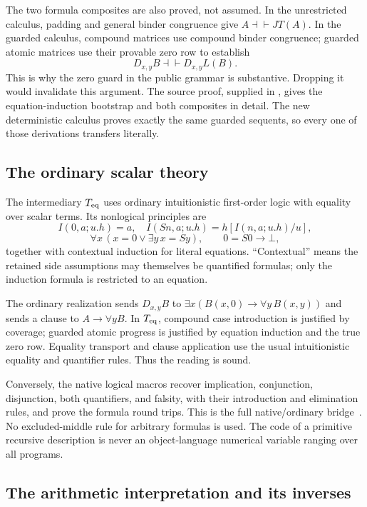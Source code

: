\documentclass[11pt,letterpaper]{article}
\theoremstyle{definition}\newtheorem{definition}[theorem]{Definition}
\theoremstyle{remark}\newtheorem{remark}[theorem]{Remark}
\begin{document}
The two formula composites are also proved, not assumed. In the unrestricted
calculus, padding and general binder congruence give $A\dashv\vdash JT(A)$.
In the guarded calculus, compound matrices use compound binder congruence;
guarded atomic matrices use their provable zero row to establish
\[
 D_{x,y}B\dashv\vdash D_{x,y}L(B).
\]
This is why the zero guard in the public grammar is substantive. Dropping it
would invalidate this argument. The source proof, supplied in
, gives the equation-induction bootstrap and
both composites in detail. The new deterministic calculus proves exactly the
same guarded sequents, so every one of those derivations transfers literally.

\subsection{The ordinary scalar theory}

The intermediary $T_{\rm eq}$ uses ordinary intuitionistic first-order logic
with equality over scalar terms. Its nonlogical principles are
\[
 I(0,a;u.h)=a,\quad I(Sn,a;u.h)=h[I(n,a;u.h)/u],
\]
\[
 \forall x\,(x=0\lor\exists y\,x=Sy),\qquad 0=S0\to\bot,
\]
together with contextual induction for literal equations. ``Contextual''
means the retained side assumptions may themselves be quantified formulas;
only the induction formula is restricted to an equation.

The ordinary realization sends $D_{x,y}B$ to
$\exists x(B(x,0)\to\forall y\,B(x,y))$ and sends a clause to
$A\to\forall y B$. In $T_{\rm eq}$, compound case introduction is justified
by coverage; guarded atomic progress is justified by equation induction and
the true zero row. Equality transport and clause application use the usual
intuitionistic equality and quantifier rules. Thus the reading is sound.

Conversely, the native logical macros recover implication, conjunction,
disjunction, both quantifiers, and falsity, with their introduction and
elimination rules, and prove the formula round trips. This is the
full native/ordinary bridge~\cite{choice,ordinary,lean}. No excluded-middle
rule for arbitrary formulas is used. The code of a primitive recursive
description is never an object-language numerical variable ranging over
all programs.

\subsection{The arithmetic interpretation and its inverses}
\end{document}
